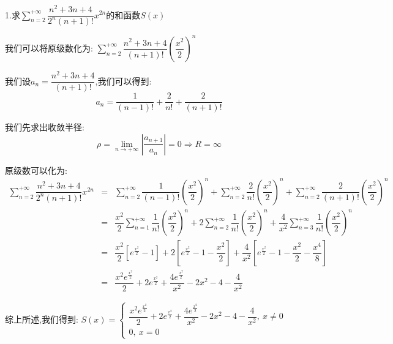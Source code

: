 1.求$\sum\limits_{n=2}^{+\infty}\dfrac{n^2+3n+4}{2^n(n+1)!}x^{2n}$的和函数$S(x)$
\begin{solution}

	我们可以将原级数化为:  $\sum\limits_{n=2}^{+\infty}\dfrac{n^2+3n+4}{(n+1)!}(\dfrac{x^2}{2})^{n}$
	
	我们设$a_{n}=\dfrac{n^2+3n+4}{(n+1)!}$,我们可以得到:  
	$$a_{n}=\dfrac{1}{(n-1)!}+\dfrac{2}{n!}+\dfrac{2}{(n+1)!}$$
	
	我们先求出收敛半径:  
	$$\rho=\lim\limits_{n\rightarrow +\infty}|\dfrac{a_{n+1}}{a_{n}}|=0\Rightarrow R=\infty$$
	
	原级数可以化为:  
	\begin{eqnarray*}
		\sum\limits_{n=2}^{+\infty}\dfrac{n^2+3n+4}{2^n(n+1)!}x^{2n}&=&\sum\limits_{n=2}^{+\infty}\dfrac{1}{(n-1)!}(\dfrac{x^2}{2})^{n}+\sum\limits_{n=2}^{+\infty}\dfrac{2}{n!}(\dfrac{x^2}{2})^{n}+\sum\limits_{n=2}^{+\infty}\dfrac{2}{(n+1)!}(\dfrac{x^2}{2})^{n}\\
		&=&\dfrac{x^2}{2}\sum\limits_{n=1}^{+\infty}\dfrac{1}{n!}(\dfrac{x^2}{2})^{n}+2\sum\limits_{n=2}^{+\infty}\dfrac{1}{n!}(\dfrac{x^2}{2})^{n}+\dfrac{4}{x^2}\sum\limits_{n=3}^{+\infty}\dfrac{1}{n!}(\dfrac{x^2}{2})^{n}\\
		&=&\dfrac{x^2}{2}\left[e^{\frac{x^2}{2}}-1\right]+2\left[e^{\frac{x^2}{2}}-1-\dfrac{x^2}{2}\right]+\dfrac{4}{x^2}\left[ e^{\frac{x^2}{2}}-1-\dfrac{x^2}{2}-\dfrac{x^4}{8}\right]\\
		&=&\dfrac{x^2e^{\frac{x^2}{2}}}{2}+2e^{\frac{x^2}{2}}+\dfrac{4e^{\frac{x^2}{2}}}{x^2}-2x^2-4-\dfrac{4}{x^2}   
	\end{eqnarray*}

	综上所述,我们得到:  $S(x)=\left\lbrace
	\begin{array}{l}
		\dfrac{x^2e^{\frac{x^2}{2}}}{2}+2e^{\frac{x^2}{2}}+\dfrac{4e^{\frac{x^2}{2}}}{x^2}-2x^2-4-\dfrac{4}{x^2},\ x\neq 0\\
		0,\ x=0
	\end{array}
	\right. $
\end{solution}


